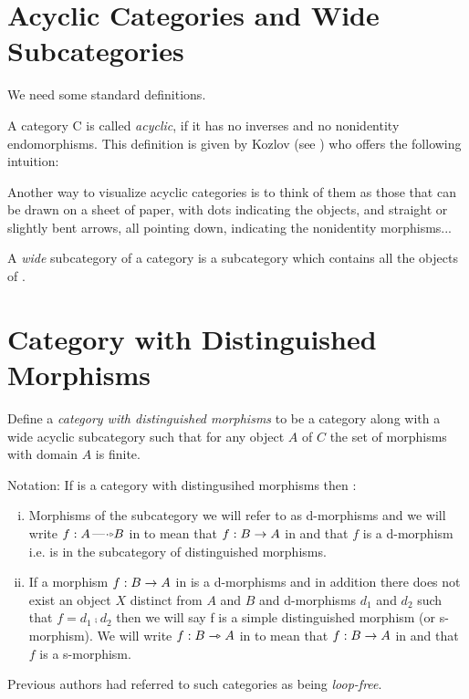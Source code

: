 \documentclass[10pt,a4paper]{scrartcl}
\begin{document}
\section {Acyclic Categories and Wide Subcategories}
We need some standard definitions.

A category C is called \textit{acyclic}, if it has no inverses and no nonidentity
endomorphisms. This definition is given by Kozlov (see \cite{Kozlov2007}) who offers the following intuition:
\begin{erquote}
Another way to visualize acyclic categories is to think of them as those
that can be drawn on a sheet of paper, with dots indicating the objects, and
straight or slightly bent arrows, all pointing down, indicating the nonidentity
morphisms...
\end{erquote}
\noindent
A \textit{wide} subcategory of a category  is a subcategory which contains all the objects of .

\section{Category with Distinguished Morphisms}

\begin{definition}
Define a \textit{category with distinguished morphisms} to be a category  along with a wide acyclic subcategory  such that for any object $A$ of $C$ the set of morphisms with domain $A$ is finite.
\end{definition} 

\noindent
Notation:
If  is a category with distingusihed morphisms then :
\begin{enumerate}[(i)]
\item Morphisms of the subcategory we will refer to as d-morphisms and we will write  
$f: A \dmorph B$ in 
to mean that 
$f: B \rightarrow A$ in  and that $f$ is a d-morphism i.e. is in the subcategory  of distinguished morphisms. 
\item If a morphism $f: B \rightarrow A$ in  is a d-morphisms and in addition
there does not exist an object $X$ distinct from $A$ and $B$ and d-morphisms $d_1$ and $d_2$
such that $f=d_1 \comp d_2$ then we will say f is a simple distinguished morphism (or s-morphism). We will write  $f:B \rightarrowtriangle A$ in 
to mean that 
$f: B \rightarrow A$ in  and that $f$ is a s-morphism.
\end{enumerate}

\noindent
Previous authors had referred to such categories as being \textit{loop-free}. \\
\end{document}
